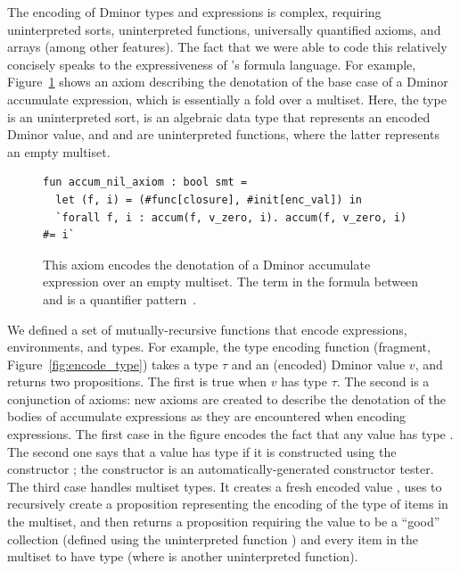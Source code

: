 \documentclass[acmsmall,screen,nonacm]{acmart}
\theoremstyle{definition}
\begin{document}
The encoding of Dminor types and expressions is complex, requiring
uninterpreted sorts, uninterpreted functions, universally quantified axioms,
and arrays (among other features).
The fact that we were able to code this relatively concisely speaks to the
expressiveness of \Name's formula language.
For example, Figure~\ref{fig:accum} shows an axiom describing the denotation of
the base case of a Dminor accumulate expression, which is essentially a fold
over a multiset.
Here, the type  is an uninterpreted sort,  is an
algebraic data type that represents an encoded Dminor value, and  and
 are uninterpreted functions, where the latter represents an empty
multiset.

\begin{figure}[!t]
    \begin{lstlisting}
fun accum_nil_axiom : bool smt =
  let (f, i) = (#func[closure], #init[enc_val]) in
  `forall f, i : accum(f, v_zero, i). accum(f, v_zero, i) #= i`
    \end{lstlisting}
		\caption{This axiom encodes the denotation of a Dminor accumulate
  expression over an empty multiset. The term in the formula between \ic{:} 
  and  is a quantifier pattern~\citep{simplify}.}
    \label{fig:accum}
\end{figure}

We defined a set of mutually-recursive functions that encode expressions,
environments, and types.
For example, the type encoding function (fragment, Figure~\ref{fig:encode_type})
takes a type $\tau$ and an (encoded) Dminor value $v$, and returns two
propositions.
The first is true when $v$ has type $\tau$.
The second is a conjunction of axioms: new axioms are created to describe the
denotation of the bodies of accumulate expressions as they are encountered when
encoding expressions.
The first case in the figure encodes the fact that any value has type .
The second one says that a value has type  if it is constructed using
the constructor ; the constructor  is an
automatically-generated constructor tester.
The third case handles multiset types.
It creates a fresh encoded value , uses  to recursively create a
proposition representing the encoding of the type  of items in the
multiset, and then returns a proposition requiring the value to be a ``good''
collection (defined using the uninterpreted function ) and every
item in the multiset to have type  (where  is another
uninterpreted function).
\end{document}
